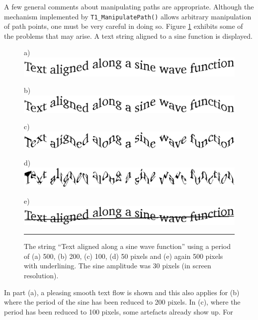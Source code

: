 A few general comments about manipulating paths are appropriate. Although the
mechanism implemented by \verb+T1_ManipulatePath()+ allows arbitrary
manipulation of path points, one must be very careful in doing so. Figure
\ref{figure:outlineproblems} exhibits some of the problems that may arise. A text
string aligned to a sine function is displayed.
\begin{figure}[t]
\hfill
a) \includegraphics[scale=0.5]{outlineproblems1.eps} %
\hfill\break

\hfill
b) \includegraphics[scale=0.5]{outlineproblems2.eps} %
\hfill\break

\hfill
c) \includegraphics[scale=0.5]{outlineproblems3.eps} %
\hfill\break

\hfill
d) \includegraphics[scale=0.5]{outlineproblems4.eps} %
\hfill\break

\hfill
e) \includegraphics[scale=0.5]{outlineproblems5.eps} %
\hfill\break
\hrule\vskip3mm\small
\caption{\label{figure:outlineproblems}The string ``Text aligned along a sine wave
  function'' using a period of (a) 500, (b) 200, (c) 100, (d) 50 pixels and
  (e) again 500 pixels with underlining. The sine amplitude was 30 pixels 
  (in screen resolution).} 
\end{figure}
In part (a), a pleasing smooth text flow is shown and this also applies for
(b) where the period of the sine has been reduced to 200 pixels. In (c), where
the period has been reduced to 100 pixels, some artefacts already show up. For
